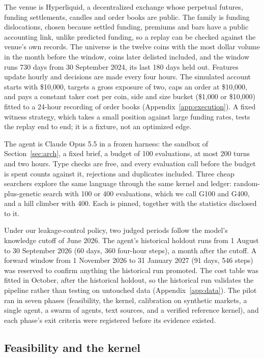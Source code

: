 \documentclass[11pt]{article}
\begin{document}
The venue is Hyperliquid, a decentralized exchange whose perpetual futures, funding settlements, candles and order books are public. The family is funding dislocations, chosen because settled funding, premiums and bars have a public accounting link, unlike predicted funding, so a replay can be checked against the venue's own records. The universe is the twelve coins with the most dollar volume in the month before the window, coins later delisted included, and the window runs 730 days from 30 September 2024, its last 180 days held out. Features update hourly and decisions are made every four hours. The simulated account starts with \$10{,}000, targets a gross exposure of two, caps an order at \$10{,}000, and pays a constant taker cost per coin, side and size bucket (\$1{,}000 or \$10{,}000) fitted to a 24-hour recording of order books (Appendix~\ref{app:execution}). A fixed witness strategy, which takes a small position against large funding rates, tests the replay end to end; it is a fixture, not an optimized edge.

The agent is Claude Opus 5.5 in a frozen harness: the sandbox of Section~\ref{sec:arch}, a fixed brief, a budget of 100 evaluations, at most 200 turns and two hours. Type checks are free, and every evaluation call before the budget is spent counts against it, rejections and duplicates included. Three cheap searchers explore the same language through the same kernel and ledger: random-plus-genetic search with 100 or 400 evaluations, which we call G100 and G400, and a hill climber with 400. Each is pinned, together with the statistics disclosed to it.

Under our leakage-control policy, two judged periods follow the model's knowledge cutoff of June 2026. The agent's historical holdout runs from 1 August to 30 September 2026 (60 days, 360 four-hour steps), a month after the cutoff. A forward window from 1 November 2026 to 31 January 2027 (91 days, 546 steps) was reserved to confirm anything the historical run promoted. The cost table was fitted in October, after the historical holdout, so the historical run validates the pipeline rather than testing on untouched data (Appendix~\ref{app:data}). The pilot ran in seven phases (feasibility, the kernel, calibration on synthetic markets, a single agent, a swarm of agents, text sources, and a verified reference kernel), and each phase's exit criteria were registered before its evidence existed.

\subsection{Feasibility and the kernel}\label{sec:pilot-kernel}
\end{document}

